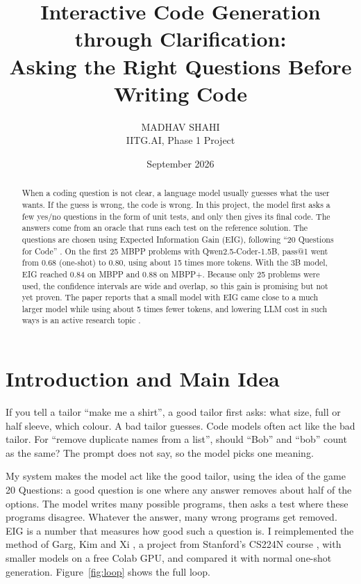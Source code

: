 \documentclass[11pt]{article}
\title{Interactive Code Generation through Clarification:\\ Asking the Right Questions Before Writing Code}
\author{MADHAV SHAHI \\ IITG.AI, Phase 1 Project}
\date{September 2026}
\begin{document}
\maketitle

\begin{abstract}
\noindent
When a coding question is not clear, a language model usually guesses what the user wants. If the guess is wrong, the code is wrong. In this project, the model first asks a few yes/no questions in the form of unit tests, and only then gives its final code. The answers come from an oracle that runs each test on the reference solution. The questions are chosen using Expected Information Gain (EIG), following ``20 Questions for Code'' \cite{garg}. On the first 25 MBPP problems with Qwen2.5-Coder-1.5B, pass@1 went from 0.68 (one-shot) to 0.80, using about 15 times more tokens. With the 3B model, EIG reached 0.84 on MBPP and 0.88 on MBPP+. Because only 25 problems were used, the confidence intervals are wide and overlap, so this gain is promising but not yet proven. The paper \cite{garg} reports that a small model with EIG came close to a much larger model while using about 5 times fewer tokens, and lowering LLM cost in such ways is an active research topic \cite{frugal}.
\end{abstract}

\section{Introduction and Main Idea}
If you tell a tailor ``make me a shirt'', a good tailor first asks: what size, full or half sleeve, which colour. A bad tailor guesses. Code models often act like the bad tailor. For ``remove duplicate names from a list'', should ``Bob'' and ``bob'' count as the same? The prompt does not say, so the model picks one meaning.

My system makes the model act like the good tailor, using the idea of the game 20 Questions: a good question is one where any answer removes about half of the options. The model writes many possible programs, then asks a test where these programs disagree. Whatever the answer, many wrong programs get removed. EIG is a number that measures how good such a question is. I reimplemented the method of Garg, Kim and Xi \cite{garg}, a project from Stanford's CS224N course \cite{cs224n}, with smaller models on a free Colab GPU, and compared it with normal one-shot generation. Figure~\ref{fig:loop} shows the full loop.
\end{document}
